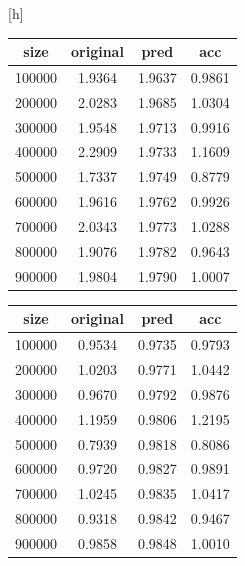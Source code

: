 \documentclass[12pt]{article}
\begin{document}
\noindent
\begin{minipage}{0.5\textwidth}[h]
    \begin{tabular}{|c|c|c|c|}
        \hline size & original & pred & acc \\
        \hline 100000 & 1.9364 & 1.9637 & 0.9861 \\
        \hline 200000 & 2.0283 & 1.9685 & 1.0304 \\
        \hline 300000 & 1.9548 & 1.9713 & 0.9916 \\
        \hline 400000 & 2.2909 & 1.9733 & 1.1609 \\
        \hline 500000 & 1.7337 & 1.9749 & 0.8779 \\
        \hline 600000 & 1.9616 & 1.9762 & 0.9926 \\
        \hline 700000 & 2.0343 & 1.9773 & 1.0288 \\
        \hline 800000 & 1.9076 & 1.9782 & 0.9643 \\
        \hline 900000 & 1.9804 & 1.9790 & 1.0007 \\
        \hline
    \end{tabular}
\end{minipage}
\begin{minipage}{0.5\textwidth}
    \begin{tabular}{|c|c|c|c|}
        \hline size & original & pred & acc \\
        \hline 100000 & 0.9534 & 0.9735 & 0.9793 \\
        \hline 200000 & 1.0203 & 0.9771 & 1.0442 \\
        \hline 300000 & 0.9670 & 0.9792 & 0.9876 \\
        \hline 400000 & 1.1959 & 0.9806 & 1.2195 \\
        \hline 500000 & 0.7939 & 0.9818 & 0.8086 \\
        \hline 600000 & 0.9720 & 0.9827 & 0.9891 \\
        \hline 700000 & 1.0245 & 0.9835 & 1.0417 \\
        \hline 800000 & 0.9318 & 0.9842 & 0.9467 \\
        \hline 900000 & 0.9858 & 0.9848 & 1.0010 \\
        \hline
    \end{tabular}
\end{minipage}
\end{document}

